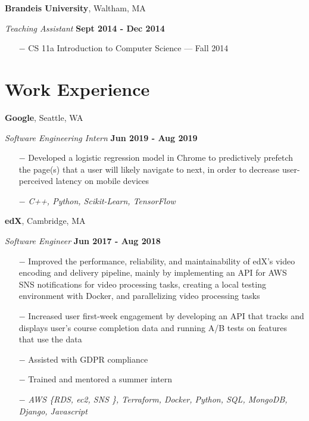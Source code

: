 \documentclass[margin,line]{res}
\begin{document}
\begin{resume}
{\bf Brandeis University}, Waltham, MA 

\vspace{-.3cm}
{\em Teaching Assistant} \hfill {\bf Sept 2014 - Dec 2014}
\begin{itemize}
	\item[$-$] CS 11a Introduction to Computer Science --- Fall 2014
\end{itemize}




\section{\sc Work Experience}
{\bf Google}, Seattle, WA 

\vspace{-.3cm}
{\em Software Engineering Intern} \hfill {\bf Jun 2019 - Aug 2019}
\begin{itemize}
  \setlength\itemsep{-.2em}
  \item[$-$] Developed a logistic regression model in Chrome to predictively prefetch the page(s) that a user will likely navigate to next, in order to decrease user-perceived latency on mobile devices
  \item[$-$] \textit{C++, Python, Scikit-Learn, TensorFlow}
\end{itemize}

{\bf edX}, Cambridge, MA 

\vspace{-.3cm}
{\em Software Engineer} \hfill {\bf Jun 2017 - Aug 2018}
\begin{itemize}
  \setlength\itemsep{-.2em}
  \item[$-$] Improved the performance, reliability, and maintainability of edX's video encoding and delivery pipeline, mainly by implementing an API for AWS SNS notifications for video processing tasks, creating a local testing environment with Docker, and parallelizing video processing tasks 
  \item[$-$] Increased user first-week engagement by developing an API that tracks and displays user's course completion data and running A/B tests on features that use the data
  \item[$-$] Assisted with GDPR compliance
  \item[$-$] Trained and mentored a summer intern
  \item[$-$] \textit{AWS \{RDS, ec2, SNS \}, Terraform, Docker, Python, SQL, MongoDB, Django, Javascript}
\end{itemize}


\end{resume}
\end{document}
